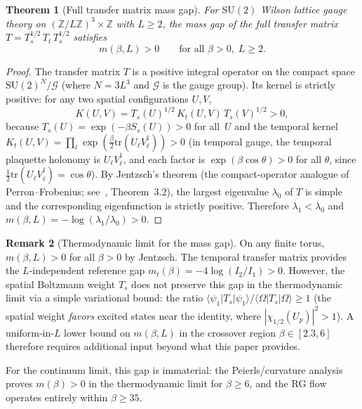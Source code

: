 \documentclass[11pt]{article}
\newtheorem{theorem}{Theorem}[section]
\theoremstyle{definition}
\newtheorem{remark}[theorem]{Remark}
\newcommand{\SU}{\mathrm{SU}}
\newcommand{\tr}{\mathrm{tr}}
\newcommand{\Z}{\mathbb{Z}}
\begin{document}
\begin{theorem}[Full transfer matrix mass gap]\label{thm:Ts}
For $\SU(2)$ Wilson lattice gauge theory on $(\Z/L\Z)^3\times\Z$
with $L\ge 2$, the mass gap of the full transfer matrix
$T=T_s^{1/2}\,T_t\,T_s^{1/2}$ satisfies
\begin{equation}\label{eq:full-gap}
m(\beta,L)>0\qquad\text{for all }\beta>0,\;L\ge 2.
\end{equation}
\end{theorem}

\begin{proof}
The transfer matrix $T$ is a positive integral operator on the compact
space $\SU(2)^N/\mathcal{G}$ (where $N=3L^3$ and $\mathcal{G}$ is the
gauge group).  Its kernel is strictly positive: for any two spatial
configurations $U,V$,
\[
K(U,V)=T_s(U)^{1/2}\,K_t(U,V)\,T_s(V)^{1/2}>0,
\]
because $T_s(U)=\exp(-\beta S_s(U))>0$ for all~$U$ and the temporal
kernel $K_t(U,V)=\prod_\ell\exp(\frac{\beta}{2}\tr(U_\ell V_\ell^\dagger))
>0$ (in temporal gauge, the temporal plaquette holonomy is
$U_\ell V_\ell^\dagger$, and each factor is $\exp(\beta\cos\theta)>0$
for all $\theta$, since $\tfrac{1}{2}\tr(U_\ell V_\ell^\dagger)=\cos\theta$).
By Jentzsch's theorem (the compact-operator analogue of
Perron--Frobenius; see~\cite{Seiler82}, Theorem~3.2), the largest
eigenvalue $\lambda_0$ of $T$ is simple and the corresponding
eigenfunction is strictly positive.  Therefore $\lambda_1<\lambda_0$ and
$m(\beta,L)=-\log(\lambda_1/\lambda_0)>0$.
\end{proof}

\begin{remark}[Thermodynamic limit for the mass gap]\label{rem:thermo}
On any finite torus, $m(\beta,L)>0$ for all $\beta>0$ by Jentzsch.
The temporal transfer matrix provides the $L$-independent reference
gap $m_t(\beta)=-4\log(I_2/I_1)>0$.  However, the spatial Boltzmann
weight $T_s$ does not preserve this gap in the thermodynamic limit
via a simple variational bound: the ratio
$\langle\psi_1|T_s|\psi_1\rangle/\langle\Omega|T_s|\Omega\rangle\ge 1$
(the spatial weight \emph{favors} excited states near the identity,
where $|\chi_{1/2}(U_p)|^2>1$).  A uniform-in-$L$ lower bound on
$m(\beta,L)$ in the crossover region $\beta\in[2.3,6]$ therefore
requires additional input beyond what this paper provides.

For the continuum limit, this gap is immaterial:
the Peierls/curvature analysis proves $m(\beta)>0$ in the thermodynamic
limit for $\beta\ge 6$, and the RG flow operates entirely within
$\beta\ge 35$.
\end{remark}
\end{document}
